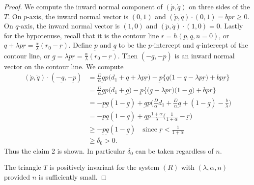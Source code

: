 \documentclass[a4paper,11pt]{article}
\begin{document}
\begin{proof}
We compute the inward normal component of $(\dot{p},\dot{q})$ on three sides of the $T$. On $p$-axis, the inward normal vector is $(0,1)$ and $(\dot{p},\dot{q})\cdot(0,1)=bpr\ge0$. On $q$-axis, the inward normal vector is $(1,0)$ and $(\dot{p},\dot{q})\cdot(1,0)=0$. Lastly for the hypotenuse, recall that it is the contour line $\underbar{r}=h(p,q,n=0)$, or $q + \lambda p\underbar{r} = \frac{\alpha}{\lambda}(r_0-\underbar{r})$. Define $\underbar{p}$ and $\underbar{q}$ to be the $p$-intercept and $q$-intercept of the contour line, or $\underbar{q} = \lambda \underbar{p}\underbar{r} = \frac{\alpha}{\lambda}(r_0-\underbar{r})$. Then $(-\underbar{q},-\underbar{p})$ is an inward normal vector on the contour line. We compute
\begin{align*}
    (\dot{p},\dot{q}) \cdot (-\underbar{q},-\underbar{p}) &= \frac{D}{\alpha}\underbar{q}p\Big(d_1 + q + \lambda p \underbar{r}\Big) -\underbar{p}\bigg\{q\Big(1-q-\lambda p \underbar{r}\Big) + b p \underbar{r}\bigg\}\\
    &=\frac{D}{\alpha}\underbar{q}p\Big(d_1 +\underbar{q}\Big) -\underbar{p}\bigg\{\Big(\underbar{q}-\lambda p \underbar{r}\Big)\Big(1-\underbar{q}\Big) + b p \underbar{r}\bigg\}\\
    &=-\underbar{p}\underbar{q}(1-\underbar{q}) + \underbar{q}p\Big(\frac{D}{\alpha}d_1 + \frac{D}{\alpha}\underbar{q} + (1-\underbar{q}) - \frac{b}{\lambda}\Big)\\
    &=-\underbar{p}\underbar{q}(1-\underbar{q}) + \underbar{q}p\frac{1+\alpha}{\lambda}\Big(\frac{1}{1+\alpha}-\underbar{r}\Big)\\
    &\ge -\underbar{p}\underbar{q}(1-\underbar{q}) \quad \text{since $\underbar{r} < \frac{1}{1+\alpha}$}\\
    &\ge \delta_0 > 0.
\end{align*}
Thus the claim 2 is shown. In particular $\delta_0$ can be taken regardless of $n$.

\medskip
{}
The triangle $T$  is positively invariant for the system $(R)$ with $(\lambda,\alpha,n)$ provided $n$ is sufficiently small.
\medskip


\end{proof}
\end{document}

